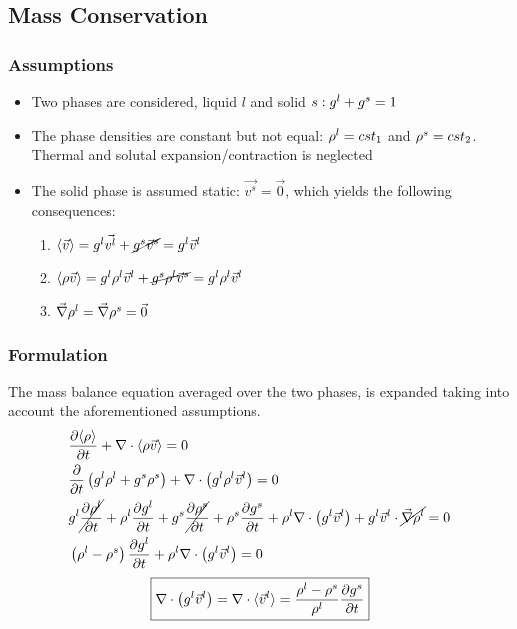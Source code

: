 \subsection{Mass Conservation}
\subsubsection{Assumptions}
\begin{itemize}
\itemsep0em
\item Two phases are considered, liquid $l$ and solid $s: {g^l}+{g^s} =1 $ %
\item The phase densities are constant but not equal: $ \rho^l=cst_1 $ and $ \rho^s=cst_2 $. Thermal and solutal expansion/contraction
is neglected
\item The solid phase is assumed static: $\vec{v^s}=\vec{0}$, which yields the following consequences:
\begin{enumerate} %
\itemsep0em
\item $ \langle \vec{v} \rangle= {g^l} \vec{v^l} + \cancel{{g^s} \vec{v}^s} = {g^l} \vec{v}^l $
\item $ \langle \rho \vec{v} \rangle = {g^l} \rho^l \vec{v}^l + \cancel{{g^s} \rho^l \vec{v}^s} = {g^l} \rho^l \vec{v}^l $
\item $\vec{\nabla} \rho^l = \vec{\nabla} \rho^s = \vec{0}$
\end{enumerate}
\end{itemize}
\subsubsection{Formulation}
The mass balance equation averaged over the two phases, is expanded taking into account the aforementioned assumptions.
\begin{subequations}
\label{eq:shrinkage}
\begin{align}
& \frac{\partial \langle \rho \rangle}{\partial t} + \nabla \cdot \langle \rho \vec{v} \rangle  = 0 \\ 
& \frac{\partial }{\partial t} \left(  {g^l} \rho^l + {g^s} \rho^s \right) + \nabla \cdot \left(  {g^l} \rho^l \vec{v}^l \right) = 0 \\ 
& {g^l} \cancel{\frac{\partial \rho^l }{\partial t}} + \rho^l \frac{\partial  {g^l} }{\partial t} 
	+ {g^s} \cancel{\frac{\partial \rho^s }{\partial t}} + \rho^s \frac{\partial  {g^s} }{\partial t} 
	+ \rho^l \nabla \cdot \left(  {g^l} \vec{v}^l \right) 
	+ {g^l} \vec{v}^l \cdot  \cancel{ \vec{\nabla} \rho^l }	 = 0 \\
& \left(  \rho^l - \rho^s  \right) \frac{\partial  {g^l} }{\partial t} + \rho^l \nabla \cdot \left(  {g^l} \vec{v}^l \right)  = 0
\end{align}
\end{subequations}
\begin{align}
\label{eq:mass_balance}
 \boxed{\nabla \cdot \left(  {g^l} \vec{v}^l \right) 
 	= \nabla \cdot \langle \vec{v}^l \rangle 
 	= \frac{\rho^l-\rho^s}{\rho^l} \frac{\partial  {g^s} }{\partial t}}
\end{align}
